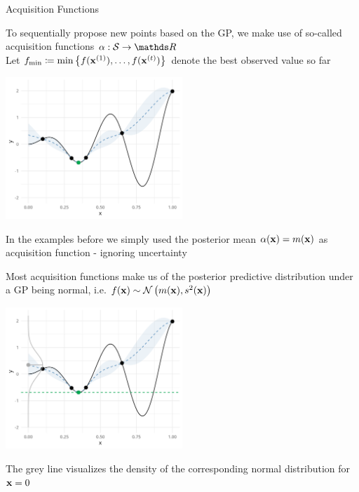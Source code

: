 \documentclass[11pt,compress,t,notes=noshow, xcolor=table]{beamer}
\begin{document}
\begin{vbframe}{Acquisition Functions}

To sequentially propose new points based on the GP, we make use of so-called acquisition functions $\alpha: \mathcal{S} \to \R$\\

Let $f_{\min} \coloneqq \min \left\{f(\mathbf{x}^{(1)}), \ldots, f(\mathbf{x}^{(t)})\right\}$ denote the best observed value so far

\vspace*{-0.2cm}

\begin{center}
  \includegraphics[width = 0.5\textwidth]{figure_man/bayesian_loop_2.png}
\end{center}

\vspace*{-0.3cm}

In the examples before we simply used the posterior mean $\alpha(\mathbf{x}) = m(\mathbf{x})$ as acquisition function - ignoring uncertainty

\framebreak

Most acquisition functions make us of the posterior predictive distribution under a GP being normal, i.e. $f(\mathbf{x}) \sim \mathcal{N}\left(m(\mathbf{x}), s^2(\mathbf{x})\right)$

\vspace*{-0.2cm}

\begin{center}
  \includegraphics[width = 0.5\textwidth]{figure_man/bayesian_loop_3.png}
\end{center}

The grey line visualizes the density of the corresponding normal distribution for $\mathbf{x} = 0$

\end{vbframe}
\end{document}
